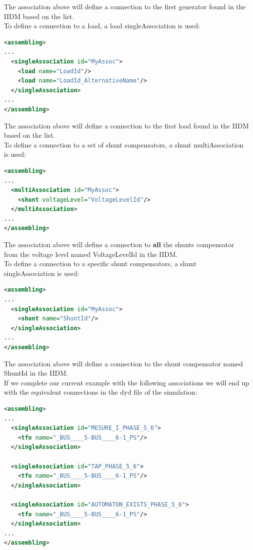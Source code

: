 \documentclass[a4paper, 12pt]{report}
\begin{document}
The association above will define a connection to the first generator found in the IIDM based on the list. \\

To define a connection to a load, a load singleAssociation is used:

 \begin{lstlisting}[language=XML, breaklines=true, breakatwhitespace=false, columns=fullflexible]
<assembling>
...
  <singleAssociation id="MyAssoc">
    <load name="LoadId"/>
    <load name="LoadId_AlternativeName"/>
  </singleAssociation>
...
</assembling>
\end{lstlisting}

The association above will define a connection to the first load found in the IIDM based on the list. \\

To define a connection to a set of shunt compensators, a shunt multiAssociation is used:

 \begin{lstlisting}[language=XML, breaklines=true, breakatwhitespace=false, columns=fullflexible]
<assembling>
...
  <multiAssociation id="MyAssoc">
    <shunt voltageLevel="VoltageLevelId"/>
  </multiAssociation>
...
</assembling>
\end{lstlisting}

The association above will define a connection to \textbf{all} the shunts compensator from the voltage level named VoltageLevelId in the IIDM. \\

To define a connection to a specific shunt compensators, a shunt singleAssociation is used:

 \begin{lstlisting}[language=XML, breaklines=true, breakatwhitespace=false, columns=fullflexible]
<assembling>
...
  <singleAssociation id="MyAssoc">
    <shunt name="ShuntId"/>
  </singleAssociation>
...
</assembling>
\end{lstlisting}

The association above will define a connection to the shunt compensator named ShuntId in the IIDM. \\

If we complete our current example with the following associations we will end up with the equivalent connections in the dyd file of the \Dynawo simulation:
 \begin{lstlisting}[language=XML, breaklines=true, breakatwhitespace=false, columns=fullflexible]
<assembling>
...
  <singleAssociation id="MESURE_I_PHASE_5_6">
    <tfo name="_BUS____5-BUS____6-1_PS"/>
  </singleAssociation>

  <singleAssociation id="TAP_PHASE_5_6">
    <tfo name="_BUS____5-BUS____6-1_PS"/>
  </singleAssociation>

  <singleAssociation id="AUTOMATON_EXISTS_PHASE_5_6">
    <tfo name="_BUS____5-BUS____6-1_PS"/>
  </singleAssociation>
...
</assembling>
\end{lstlisting}
\end{document}
